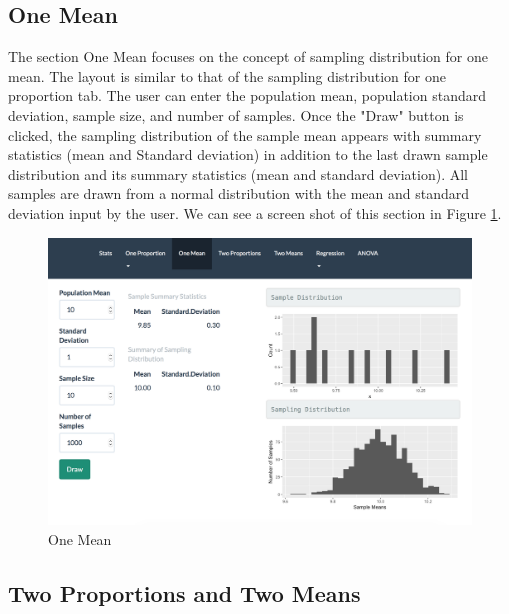 \documentclass[11pt]{book}
\begin{document}
\newpage
\subsection{One Mean}
The section One Mean focuses on the concept of sampling distribution for one mean. The layout is similar to that of the sampling distribution for one proportion tab.  The user can enter the population mean, population standard deviation, sample size, and number of samples.  Once the "Draw" button is clicked, the sampling distribution of the sample mean appears with summary statistics (mean and Standard deviation) in addition to the last drawn sample distribution and its summary statistics (mean and standard deviation). All samples are drawn from a normal distribution with the mean and standard deviation input by the user.   We can see a screen shot of this section in Figure \ref{fig:OneMean}.

\begin{figure}
\centering
        \includegraphics[width=\textwidth]{OneMean.png}
        \caption{One Mean}
        \label{fig:OneMean}
        
\end{figure}

\subsection{Two Proportions and Two Means}
\end{document}

